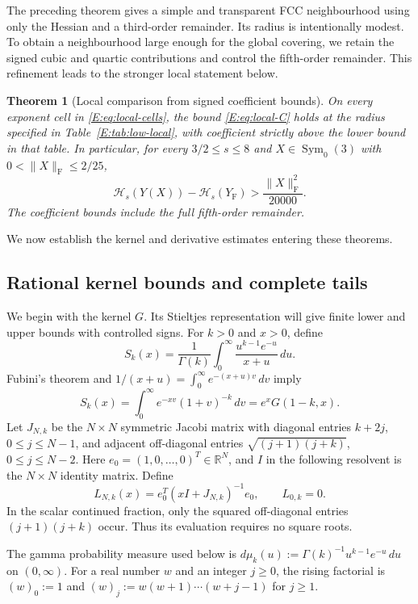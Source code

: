 \documentclass[reqno,english]{amsart}
\newtheorem{theorem}{Theorem}[section]
\theoremstyle{definition}
\newtheorem{open problem}[theorem]{Open Problem}
\theoremstyle{remark}
\theoremstyle{plain}
\newcommand{\R}{{\mathbb R}}
\numberwithin{equation}{section}
\newcommand{\YF}{Y_{\mathrm F}}
\newcommand{\HH}{\mathcal H}
\newcommand{\norm}[1]{\lVert#1\rVert_{\mathrm F}}
\newcommand{\Symzero}{\operatorname{Sym}_0(3)}
\begin{document}
The preceding theorem gives a simple and transparent FCC neighbourhood using only the Hessian and a third-order remainder. Its radius is intentionally modest. To obtain a neighbourhood large enough for the global covering, we retain the signed cubic and quartic contributions and control the fifth-order remainder. This refinement leads to the stronger local statement below.

\begin{theorem}[Local comparison from signed coefficient bounds]\label{E:thm:low-local}
On every exponent cell in \eqref{E:eq:local-cells}, the bound
\eqref{E:eq:local-C} holds at the radius specified in
Table~\ref{E:tab:low-local}, with coefficient strictly above the lower bound
in that table. In particular, for every $3/2\le s\le8$ and
$X\in\Symzero$ with
$0<\norm X\le2/25$,
\begin{equation}\label{E:eq:uniform-low-ball}
 \HH_s(Y(X))-\HH_s(\YF)>\frac{\norm X^2}{20000}.
\end{equation}
The coefficient bounds include the full fifth-order remainder.
\end{theorem}

We now establish the kernel and derivative estimates entering these theorems.

\subsection{Rational kernel bounds and complete tails}\label{E:sec:kernels}
We begin with the kernel $G$. Its Stieltjes representation will give
finite lower and upper bounds with controlled signs. For $k>0$ and
$x>0$, define
\[
 S_k(x)=\frac1{\Gamma(k)}\int_0^\infty\frac{u^{k-1}e^{-u}}{x+u}\,du.
\]
Fubini's theorem and $1/(x+u)=\int_0^\infty e^{-(x+u)v}\,dv$ imply
\begin{equation}
 S_k(x)=\int_0^\infty e^{-xv}(1+v)^{-k}\,dv=e^xG(1-k,x).
 \label{E:eq:stieltjes}
\end{equation}
Let $J_{N,k}$ be the $N\times N$ symmetric Jacobi matrix with diagonal entries $k+2j$, $0\le j\le N-1$, and adjacent off-diagonal entries $\sqrt{(j+1)(j+k)}$, $0\le j\le N-2$. Here $e_0=(1,0,\ldots,0)^T\in\R^N$, and $I$ in the following
resolvent is the $N\times N$ identity matrix. Define
\[
 L_{N,k}(x)=e_0^T(xI+J_{N,k})^{-1}e_0,\qquad L_{0,k}=0.
\]
In the scalar continued fraction, only the squared off-diagonal
entries $(j+1)(j+k)$ occur. Thus its evaluation requires no square
roots.

The gamma probability measure used below is
$d\mu_k(u):=\Gamma(k)^{-1}u^{k-1}e^{-u}\,du$ on $(0,\infty)$.
For a real number $w$ and an integer $j\ge0$, the rising factorial is
$(w)_0:=1$ and $(w)_j:=w(w+1)\cdots(w+j-1)$ for $j\ge1$.
\end{document}
